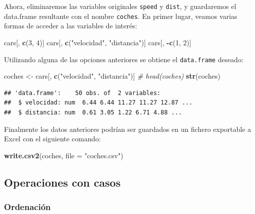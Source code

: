 \documentclass[]{book}
\newenvironment{Shaded}{\begin{snugshade}}{\end{snugshade}}
\newcommand{\KeywordTok}[1]{\textcolor[rgb]{0.13,0.29,0.53}{\textbf{#1}}}
\newcommand{\DataTypeTok}[1]{\textcolor[rgb]{0.13,0.29,0.53}{#1}}
\newcommand{\DecValTok}[1]{\textcolor[rgb]{0.00,0.00,0.81}{#1}}
\newcommand{\StringTok}[1]{\textcolor[rgb]{0.31,0.60,0.02}{#1}}
\newcommand{\CommentTok}[1]{\textcolor[rgb]{0.56,0.35,0.01}{\textit{#1}}}
\newcommand{\OperatorTok}[1]{\textcolor[rgb]{0.81,0.36,0.00}{\textbf{#1}}}
\newcommand{\NormalTok}[1]{#1}
\begin{document}
Ahora, eliminaremos las variables originales \texttt{speed} y
\texttt{dist}, y guardaremos el data.frame resultante con el nombre
\texttt{coches}. En primer lugar, veamos varias formas de acceder a las
variables de interés:

\begin{Shaded}
\begin{Highlighting}[]
\NormalTok{cars[, }\KeywordTok{c}\NormalTok{(}\DecValTok{3}\NormalTok{, }\DecValTok{4}\NormalTok{)]}
\NormalTok{cars[, }\KeywordTok{c}\NormalTok{(}\StringTok{"velocidad"}\NormalTok{, }\StringTok{"distancia"}\NormalTok{)]}
\NormalTok{cars[, }\OperatorTok{-}\KeywordTok{c}\NormalTok{(}\DecValTok{1}\NormalTok{, }\DecValTok{2}\NormalTok{)]}
\end{Highlighting}
\end{Shaded}

Utilizando alguna de las opciones anteriores se obtiene el
\texttt{data.frame} deseado:

\begin{Shaded}
\begin{Highlighting}[]
\NormalTok{coches <-}\StringTok{ }\NormalTok{cars[, }\KeywordTok{c}\NormalTok{(}\StringTok{"velocidad"}\NormalTok{, }\StringTok{"distancia"}\NormalTok{)]}
\CommentTok{# head(coches)}
\KeywordTok{str}\NormalTok{(coches)}
\end{Highlighting}
\end{Shaded}

\begin{verbatim}
## 'data.frame':    50 obs. of  2 variables:
##  $ velocidad: num  6.44 6.44 11.27 11.27 12.87 ...
##  $ distancia: num  0.61 3.05 1.22 6.71 4.88 ...
\end{verbatim}

Finalmente los datos anteriores podrían ser guardados en un fichero
exportable a Excel con el siguiente comando:

\begin{Shaded}
\begin{Highlighting}[]
\KeywordTok{write.csv2}\NormalTok{(coches, }\DataTypeTok{file =} \StringTok{"coches.csv"}\NormalTok{)}
\end{Highlighting}
\end{Shaded}

\subsection{Operaciones con casos}\label{operaciones-con-casos}

\subsubsection{Ordenación}\label{ordenacion}
\end{document}
